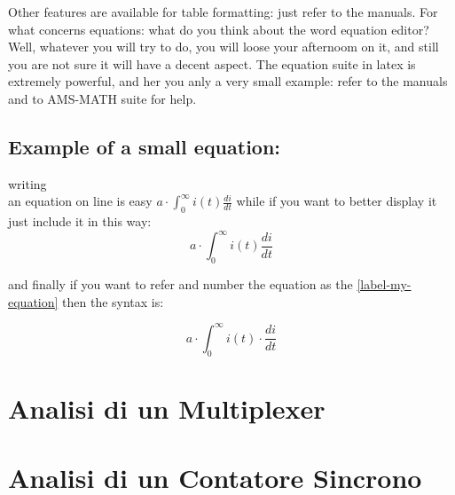Other features are available for table formatting: just refer to the manuals.
For what concerns equations: what do you think about the word equation editor?
Well, whatever you will try to do, you will loose your afternoom on it, and
still you are not sure it will have a decent aspect. The equation suite
in latex is extremely powerful, and her you anly a very small example:
refer to the manuals and to AMS-MATH suite for help.


\subsection{Example of a small equation:}

writing \\
an equation on line is easy $a \cdot \int^{\infty}_0 i(t)
\frac{di}{dt}$
while if you want to better display it just include it in this way:
$$a \cdot \int^{\infty}_0 i(t) \frac{di}{dt}$$

and finally if you want to refer and number the equation as the
\ref{label-my-equation} then the syntax is:

\begin{equation}
a \cdot \int^{\infty}_0 i(t) \cdot \frac{di}{dt}
\label{label-my-equation}
\end{equation}

\section{Analisi di un Multiplexer}



\section{Analisi di un Contatore Sincrono}

